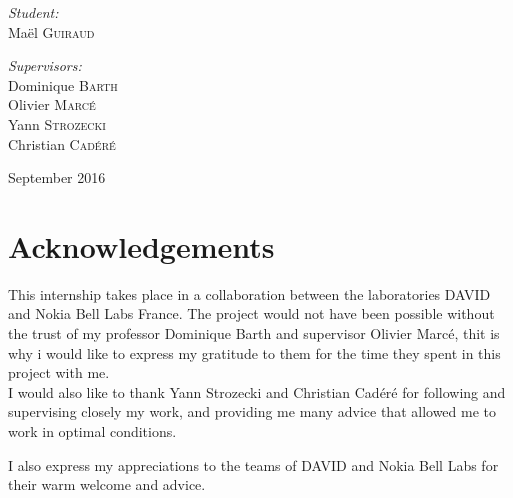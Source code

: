 \documentclass[a4paper,10pt]{report}
\newcommand{\reportauthor}{Maël \textsc{Guiraud }} %
\begin{document}
\begin{titlepage}
\begin{center}
\begin{minipage}[t]{0.3\textwidth}
  \begin{flushleft} \large
    \emph{Student:}\\
    \reportauthor 
  \end{flushleft}
\end{minipage}
\begin{minipage}[t]{0.6\textwidth}
  \begin{flushright} \large
    \emph{Supervisors:} \\
    Dominique \textsc{Barth} \\
    Olivier \textsc{Marcé} \\
    Yann \textsc{Strozecki} \\
    Christian \textsc{Cadéré} \\

  \end{flushright}
\end{minipage}

\vfill

{\large September 2016}

\end{center}

\end{titlepage}

\newpage
\null
\newpage

\section*{Acknowledgements}
This internship takes place in a collaboration between the laboratories DAVID and Nokia Bell Labs France.
The project would not have been possible without the trust of my professor Dominique Barth and supervisor Olivier Marcé, thit is why i would like to express my gratitude to them for the time they spent in this project with me.\\

I would also like to thank Yann Strozecki and Christian Cadéré for following and supervising closely my work, and providing me many advice that allowed me to work in optimal conditions.

I also express my appreciations to the teams of DAVID and Nokia Bell Labs for their warm welcome and advice.
\tableofcontents
\end{document}
